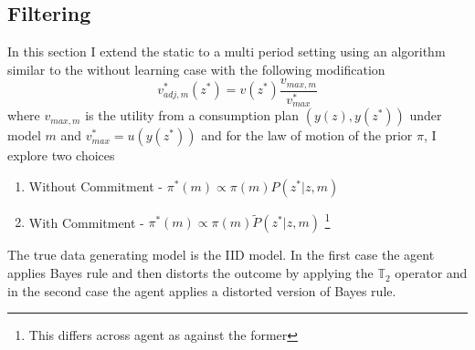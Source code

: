 \documentclass[12pt]{article}
\begin{document}
\subsection{Filtering}
In this section I extend the static to a multi period setting using an algorithm similar to the without learning case with the following modification
\[v^*_{adj,m}(z^*)=v(z^*)\frac{v_{max,m}}{v^*_{max}}\]
where 
$v_{max,m}$ is the utility from a consumption plan $(y(z),y(z^*))$ under model $m$ and $v^*_{max} = u(y(z^*))$
and for the law of motion of the prior $\pi$, I explore two choices
\begin{enumerate}
\item Without Commitment - $\pi^*(m)\propto \pi(m)P(z^*|z,m)$
\item With Commitment - $\pi^*(m)\propto \pi(m)\tilde{P}(z^*|z,m)$ \footnote{This differs across agent as against the former}
\end{enumerate}
\noindent The true data generating model is the IID model. In the first case the agent applies Bayes rule and then distorts the outcome by applying the $\mathbb{T}_2$ operator and in the second case the agent applies a distorted version of Bayes rule. 
\end{document}

